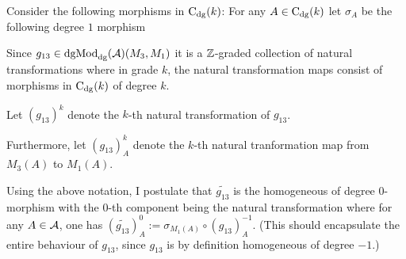\documentclass[a4paper, 12pt]{article}
\begin{document}
Consider the following morphisms in \( \operatorname{C}_{\operatorname{dg}}(k) \): For any \( A \in \operatorname{C}_{\operatorname{dg}}(k) \) let \( \sigma_A \) be the following degree \( 1 \) morphism
\begin{center}
    \newcommand{\height}{2cm}
\end{center}

Since \( g_{13} \in \operatorname{dgMod}_{\operatorname{dg}}({\mathcal{A}})(M_3, M_1) \) it is a \( {\mathbb{Z}} \)-graded collection of natural transformations where in grade \( k \), the natural transformation maps consist of morphisms in \( \operatorname{C}_{\operatorname{dg}}(k) \) of degree \( k \).

Let \( (g_{13})^k \) denote the \( k \)-th natural transformation of \( g_{13} \).

Furthermore, let \( (g_{13})^k_A \) denote the \( k \)-th natural tranformation map from \( M_3(A) \) to \( M_1(A) \).

Using the above notation, I postulate that \( \widetilde{g_{13}} \) is the homogeneous of degree \( 0 \)-morphism with the \( 0 \)-th component being the natural transformation where for any \( A \in {\mathcal{A}} \), one has \( (\widetilde{g_{13}})_A^0 := \sigma_{M_1(A)} \circ (g_{13})^{-1}_A \). (This should encapsulate the entire behaviour of \( g_{13} \), since \( g_{13} \) is by definition homogeneous of degree \( -1 \).)
\end{document}
